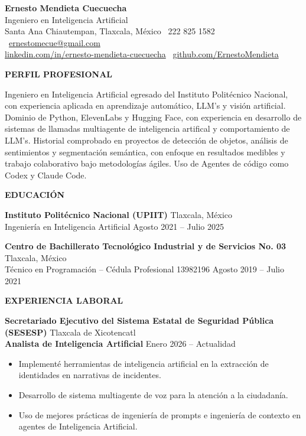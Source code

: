 \documentclass[11pt]{article}
\newcommand{\seccion}[1]{%
    \vspace{4pt}
    \begin{center}
        \textbf{\MakeUppercase{#1}}
    \end{center}
    \vspace{-10pt}
    \hrulefill
    \vspace{2pt}
}
\begin{document}
\begin{center}
    {\LARGE \textbf{Ernesto Mendieta Cuecuecha}}\\[2pt]
    Ingeniero en Inteligencia Artificial\\[4pt]
    Santa Ana Chiautempan, Tlaxcala, México \textbullet\ 222 825 1582 \textbullet\ \href{mailto:ernestomecue@gmail.com}{ernestomecue@gmail.com}\\
    \href{https://www.linkedin.com/in/ernesto-mendieta-cuecuecha-90135125a/}{linkedin.com/in/ernesto-mendieta-cuecuecha} \textbullet\ \href{https://github.com/ErnestoMendieta}{github.com/ErnestoMendieta}
\end{center}

\seccion{Perfil Profesional}

\hspace{\parindent} Ingeniero en Inteligencia Artificial egresado del Instituto Politécnico Nacional, con experiencia aplicada en aprendizaje automático, LLM's y visión artificial. Dominio de Python, ElevenLabs y Hugging Face, con experiencia en desarrollo de sistemas de llamadas multiagente de inteligencia artifical y comportamiento de LLM's. Historial comprobado en proyectos de detección de objetos, análisis de sentimientos y segmentación semántica, con enfoque en resultados medibles y trabajo colaborativo bajo metodologías ágiles. Uso de Agentes de código como Codex y Claude Code.

\seccion{Educación}

\textbf{Instituto Politécnico Nacional (UPIIT)} \hfill Tlaxcala, México\\
Ingeniería en Inteligencia Artificial \hfill Agosto 2021 -- Julio 2025

\vspace{8pt}

\textbf{Centro de Bachillerato Tecnológico Industrial y de Servicios No. 03} \hfill Tlaxcala, México\\
Técnico en Programación -- Cédula Profesional 13982196 \hfill Agosto 2019 -- Julio 2021

\seccion{Experiencia Laboral}

\textbf{Secretariado Ejecutivo del Sistema Estatal de Seguridad Pública (SESESP)} \hfill Tlaxcala de Xicotencatl\\
\textbf{Analista de Inteligencia Artificial} \hfill Enero 2026 -- Actualidad
\begin{itemize}[noitemsep, topsep=2pt, partopsep=0pt, parsep=2pt, leftmargin=0.55cm]
    \item Implementé herramientas de inteligencia artificial en la extracción de identidades en narrativas de incidentes.
    \item Desarrollo de sistema multiagente de voz para la atención a la ciudadanía.
    \item Uso de mejores prácticas de ingeniería de prompts e ingeniería de contexto en agentes de Inteligencia Artificial.
\end{itemize}
\end{document}

